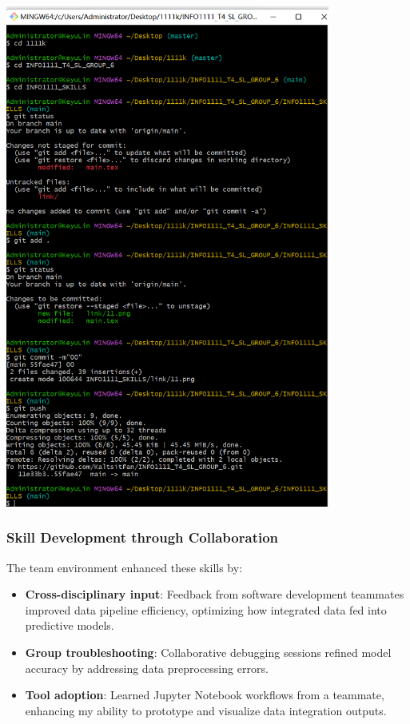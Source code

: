 \documentclass[a4paper, 11pt]{report}
\begin{document}
\begin{center}
\includegraphics[width=0.8\textwidth]{link/33.png}
\end{center}
\subsubsection*{Skill Development through Collaboration}
The team environment enhanced these skills by:
\begin{itemize}
    \item \textbf{Cross-disciplinary input}: Feedback from software development teammates improved data pipeline efficiency, optimizing how integrated data fed into predictive models.
    \item \textbf{Group troubleshooting}: Collaborative debugging sessions refined model accuracy by addressing data preprocessing errors.
    \item \textbf{Tool adoption}: Learned Jupyter Notebook workflows from a teammate, enhancing my ability to prototype and visualize data integration outputs.
\end{itemize}
\end{document}
